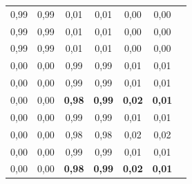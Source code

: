 \documentclass{VUMIFPSbakalaurinis}
\begin{document}
\begin{table}[]
{\begin{tabular}{|cc|cc|cc|l}
        \multicolumn{1}{|c|}{0,99}                & 0,99                 & \multicolumn{1}{c|}{0,01}                & 0,01                 & \multicolumn{1}{c|}{0,00}                & 0,00                 &  \\ \cline{1-6}
        \multicolumn{1}{|c|}{0,99}                & 0,99                 & \multicolumn{1}{c|}{0,01}                & 0,01                 & \multicolumn{1}{c|}{0,00}                & 0,00                 &  \\ \cline{1-6}
        \multicolumn{1}{|c|}{0,99}                & 0,99                 & \multicolumn{1}{c|}{0,01}                & 0,01                 & \multicolumn{1}{c|}{0,00}                & 0,00                 &  \\ \cline{1-6}
        \multicolumn{1}{|c|}{0,00}                & 0,00                 & \multicolumn{1}{c|}{0,99}                & 0,99                 & \multicolumn{1}{c|}{0,01}                & 0,01                 &  \\ \cline{1-6}
        \multicolumn{1}{|c|}{0,00}                & 0,00                 & \multicolumn{1}{c|}{0,99}                & 0,99                 & \multicolumn{1}{c|}{0,01}                & 0,01                 &  \\ \cline{1-6}
        \multicolumn{1}{|c|}{0,00}                & 0,00                 & \multicolumn{1}{c|}{\textbf{0,98}}       & \textbf{0,99}        & \multicolumn{1}{c|}{\textbf{0,02}}       & \textbf{0,01}        &  \\ \cline{1-6}
        \multicolumn{1}{|c|}{0,00}                & 0,00                 & \multicolumn{1}{c|}{0,99}                & 0,99                 & \multicolumn{1}{c|}{0,01}                & 0,01                 &  \\ \cline{1-6}
        \multicolumn{1}{|c|}{0,00}                & 0,00                 & \multicolumn{1}{c|}{0,98}                & 0,98                 & \multicolumn{1}{c|}{0,02}                & 0,02                 &  \\ \cline{1-6}
        \multicolumn{1}{|c|}{0,00}                & 0,00                 & \multicolumn{1}{c|}{0,99}                & 0,99                 & \multicolumn{1}{c|}{0,01}                & 0,01                 &  \\ \cline{1-6}
        \multicolumn{1}{|c|}{0,00}                & 0,00                 & \multicolumn{1}{c|}{\textbf{0,98}}       & \textbf{0,99}        & \multicolumn{1}{c|}{\textbf{0,02}}       & \textbf{0,01}        &  \\ \cline{1-6}

\end{tabular}}
\end{table}
\end{document}
